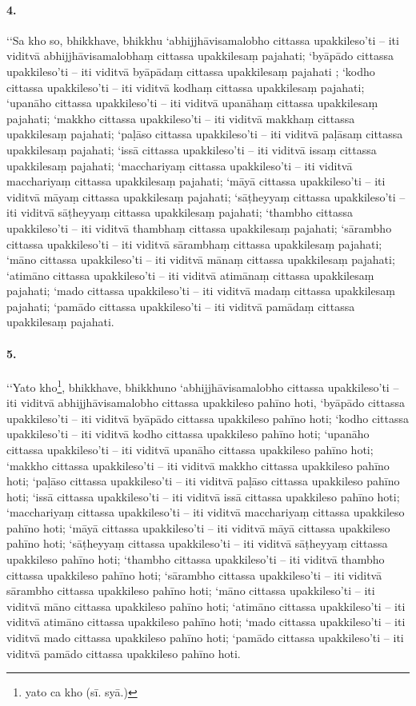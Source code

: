 \paragraph{4.} ‘‘Sa kho so, bhikkhave, bhikkhu ‘abhijjhāvisamalobho cittassa upakkileso’ti – iti viditvā abhijjhāvisamalobhaṃ cittassa upakkilesaṃ pajahati; ‘byāpādo cittassa upakkileso’ti – iti viditvā byāpādaṃ cittassa upakkilesaṃ pajahati ; ‘kodho cittassa upakkileso’ti – iti viditvā kodhaṃ cittassa upakkilesaṃ pajahati; ‘upanāho cittassa upakkileso’ti – iti viditvā upanāhaṃ cittassa upakkilesaṃ pajahati; ‘makkho cittassa upakkileso’ti – iti viditvā makkhaṃ cittassa upakkilesaṃ pajahati; ‘paḷāso cittassa upakkileso’ti – iti viditvā paḷāsaṃ cittassa upakkilesaṃ pajahati; ‘issā cittassa upakkileso’ti – iti viditvā issaṃ cittassa upakkilesaṃ pajahati; ‘macchariyaṃ cittassa upakkileso’ti – iti viditvā macchariyaṃ cittassa upakkilesaṃ pajahati; ‘māyā cittassa upakkileso’ti – iti viditvā māyaṃ cittassa upakkilesaṃ pajahati; ‘sāṭheyyaṃ cittassa upakkileso’ti – iti viditvā sāṭheyyaṃ cittassa upakkilesaṃ pajahati; ‘thambho cittassa upakkileso’ti – iti viditvā thambhaṃ cittassa upakkilesaṃ pajahati; ‘sārambho cittassa upakkileso’ti – iti viditvā sārambhaṃ cittassa upakkilesaṃ pajahati; ‘māno cittassa upakkileso’ti – iti viditvā mānaṃ cittassa upakkilesaṃ pajahati; ‘atimāno cittassa upakkileso’ti – iti viditvā atimānaṃ cittassa upakkilesaṃ pajahati; ‘mado cittassa upakkileso’ti – iti viditvā madaṃ cittassa upakkilesaṃ pajahati; ‘pamādo cittassa upakkileso’ti – iti viditvā pamādaṃ cittassa upakkilesaṃ pajahati.

\paragraph{5.} ‘‘Yato kho\footnote{yato ca kho (sī. syā.)}, bhikkhave, bhikkhuno ‘abhijjhāvisamalobho cittassa upakkileso’ti – iti viditvā abhijjhāvisamalobho cittassa upakkileso pahīno hoti, ‘byāpādo cittassa upakkileso’ti – iti viditvā byāpādo cittassa upakkileso pahīno hoti; ‘kodho cittassa upakkileso’ti – iti viditvā kodho cittassa upakkileso pahīno hoti; ‘upanāho cittassa upakkileso’ti – iti viditvā upanāho cittassa upakkileso pahīno hoti; ‘makkho cittassa upakkileso’ti – iti viditvā makkho cittassa upakkileso pahīno hoti; ‘paḷāso cittassa upakkileso’ti – iti viditvā paḷāso cittassa upakkileso pahīno hoti; ‘issā cittassa upakkileso’ti – iti viditvā issā cittassa upakkileso pahīno hoti; ‘macchariyaṃ cittassa upakkileso’ti – iti viditvā macchariyaṃ cittassa upakkileso pahīno hoti; ‘māyā cittassa upakkileso’ti – iti viditvā māyā cittassa upakkileso pahīno hoti; ‘sāṭheyyaṃ cittassa upakkileso’ti – iti viditvā sāṭheyyaṃ cittassa upakkileso pahīno hoti; ‘thambho cittassa upakkileso’ti – iti viditvā thambho cittassa upakkileso pahīno hoti; ‘sārambho cittassa upakkileso’ti – iti viditvā sārambho cittassa upakkileso pahīno hoti; ‘māno cittassa upakkileso’ti – iti viditvā māno cittassa upakkileso pahīno hoti; ‘atimāno cittassa upakkileso’ti – iti viditvā atimāno cittassa upakkileso pahīno hoti; ‘mado cittassa upakkileso’ti – iti viditvā mado cittassa upakkileso pahīno hoti; ‘pamādo cittassa upakkileso’ti – iti viditvā pamādo cittassa upakkileso pahīno hoti.

